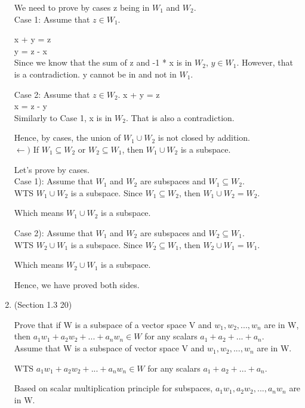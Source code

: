 \documentclass[12pt]{article}
\begin{document}
\begin{enumerate}
    We need to prove by cases z being in $W_1$ and $W_2$.
    \\
    Case 1:
    Assume that $z \in W_1$. 

    x + y = z \\
    y = z - x \\
    Since we know that the sum of z and -1 * x is in $W_2$, $y \in W_1$. 
    However, that is a contradiction. y cannot be in and not in $W_1$. 

    Case 2:
    Assume that $z \in W_2$. 
    x + y = z \\
    x = z - y \\
    Similarly to Case 1, x is in $W_2$. That is also a contradiction. 

    Hence, by cases, the union of $W_1 \cup W_2$ is not closed by addition. \\
    
    $\leftarrow)$ If $W_1 \subseteq W_2$ or $W_2 \subseteq W_1$, then $W_1 \cup W_2$ is a subspace.

    Let's prove by cases. \\

    Case 1):
    Assume that $W_1$ and $W_2 $ are subspaces and $W_1 \subseteq W_2$. \\
    WTS $W_1 \cup W_2$ is a subspace. 
    Since $W_1 \subseteq W_2$, then $W_1 \cup W_2 = W_2.$ 

    Which means $W_1 \cup W_2$ is a subspace. 

    Case 2):
    Assume that $W_1$ and $W_2 $ are subspaces and $W_2 \subseteq W_1$. \\
    WTS $W_2 \cup W_1$ is a subspace. 
    Since $W_2 \subseteq W_1$, then $W_2 \cup W_1 = W_1.$ 

    Which means $W_2 \cup W_1$ is a subspace. 

    Hence, we have proved both sides. \qedsymbol{}
    \item (Section 1.3 20)

    Prove that if W is a subspace of a vector space V and $w_1, w_2, ..., w_n$ are in W, then $a_1w_1 + a_2w_2 + ... + a_nw_n \in W$ for any scalars $a_1 + a_2 + ... + a_n$.  \\

    Assume that W is a subspace of vector space V and $w_1, w_2, ..., w_n$ are in W.

    WTS $a_1w_1 + a_2w_2 + ... + a_nw_n \in W$ for any scalars $a_1 + a_2 + ... + a_n$.

    Based on scalar multiplication principle for subspaces, $a_1w_1, a_2w_2, ..., a_nw_n$ are in W. 


\end{enumerate}
\end{document}
